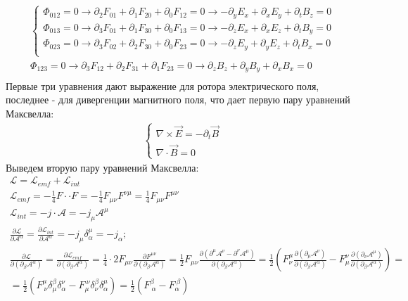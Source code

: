 \begin{gather*}
\begin{cases}
\Phi_{012} = 0 \rightarrow  \partial_2 F_{01} + \partial_1 F_{20} + \partial_0 F_{12} = 0 \rightarrow -\partial_y E_x + \partial_x E_y + \partial_t B_z = 0\\
\Phi_{013} = 0 \rightarrow  \partial_3 F_{01} + \partial_1 F_{30} + \partial_0 F_{13} = 0 \rightarrow -\partial_z E_x + \partial_x E_z + \partial_t B_y = 0\\
\Phi_{023} = 0 \rightarrow  \partial_3 F_{02} + \partial_2 F_{30} + \partial_0 F_{23} = 0 \rightarrow -\partial_z E_y + \partial_y E_z + \partial_t B_x = 0\\
\end{cases}
\\
\Phi_{123} = 0 \rightarrow  \partial_3 F_{12} + \partial_2 F_{31} + \partial_1 F_{23} = 0 \rightarrow \partial_z B_z + \partial_y B_y + \partial_x B_x = 0\\
\end{gather*}
Первые три уравнения дают выражение для ротора электрического поля, последнее - для дивергенции магнитного поля, что дает первую пару уравнений Максвелла:
\begin{gather*}
\begin{cases}
\nabla \times \vec E = -\partial_t \vec B\\
\nabla \cdot \vec B = 0
\end{cases}
\end{gather*}
Выведем вторую пару уравнений Максвелла:
\begin{gather*}
\mathcal L = \mathcal L_{emf} + \mathcal L_{int}\\
\mathcal L_{emf} = -\frac{1}{4} F \cdot\cdot F = -\frac{1}{4}F_{\mu \nu}F^{\nu\mu} = \frac{1}{4}F_{\mu\nu}F^{\mu\nu}\\
\mathcal L_{int} = -j \cdot \mathcal A = -j_\mu \mathcal A^\mu\\
\frac{\partial\mathcal L}{\partial \mathcal A^\alpha} = \frac{\partial\mathcal L_{int}}{\partial \mathcal A^\alpha} = -j_\mu \delta_\alpha^\mu = -j_\alpha;\\
\frac{\partial \mathcal L}{\partial(\partial_\beta \mathcal A^\alpha)} = \frac{\partial \mathcal L_{emf}}{\partial(\partial_\beta\mathcal A^\alpha)} = \frac{1}{4} \cdot 2F_{\mu\nu}\frac{\partial F^{\mu \nu}}{\partial(\partial_\beta \mathcal A^\alpha)} = \frac{1}{2}F_{\mu\nu}\frac{\partial(\partial^\mu\mathcal A^\nu - \partial^\nu \mathcal A^\mu)}{\partial(\partial_\beta \mathcal A^\alpha)} = \frac{1}{2}\left(F^\mu_\nu\frac{\partial(\partial_\mu\mathcal A^\nu)}{\partial(\partial_\beta \mathcal A^\alpha)} - F^\nu_\mu\frac{\partial(\partial_\nu\mathcal A^\mu)}{\partial(\partial_\beta \mathcal A^\alpha)}\right) =\\ =  \frac{1}{2} \left( F^\mu_{\ \nu} \delta^\beta_\mu \delta^\nu_\alpha - F^{\ \nu}_\mu \delta^\beta_\nu \delta^\mu_\alpha \right) = \frac{1}{2} \left(F^\beta_{\ \alpha} - F^{\ \beta}_\alpha\right)
\end{gather*}
